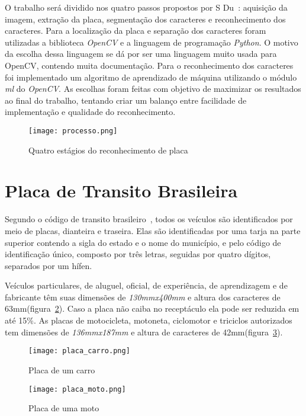 O trabalho será dividido nos quatro passos propostos por S
Du~\cite{s2013automatic}: aquisição da imagem, extração da placa, segmentação
dos caracteres e reconhecimento dos caracteres. Para a localização da placa e separação dos
caracteres foram utilizadas a biblioteca \emph{OpenCV} e a linguagem de programação
\emph{Python}. O motivo da escolha dessa linguagem se dá por ser uma linguagem
muito usada para OpenCV\@, contendo muita documentação. Para o reconhecimento dos caracteres foi implementado um algoritmo de aprendizado de máquina utilizando o módulo \emph{ml} do \emph{OpenCV}. As escolhas foram feitas
com objetivo de maximizar os resultados ao final do trabalho, tentando criar
um balanço entre facilidade de implementação e qualidade do reconhecimento.

\begin{figure}[H]
	\centering
	\texttt{[image: processo.png]}
	\caption{Quatro estágios do reconhecimento de placa}
	\label{fig:processo}
\end{figure}

\section{Placa de Transito Brasileira}
\label{sec:placabr}

Segundo o código de transito brasileiro~\cite{brasil1997lei}, todos os veículos
são identificados por meio de placas, dianteira e traseira. Elas são
identificadas por uma tarja na parte superior contendo a sigla do estado e o
nome do município, e pelo código de identificação único, composto por três
letras, seguidas por quatro dígitos, separados por um hífen.

Veículos particulares, de aluguel, oficial, de experiência, de aprendizagem e de
fabricante têm suas dimensões de \emph{130mmx400mm} e altura dos caracteres de 63mm(figura~\ref{fig:placa_carro}).
Caso a placa não caiba no receptáculo ela pode ser reduzida em até 15\%. As
placas de motocicleta, motoneta, ciclomotor e triciclos autorizados tem
dimensões de \emph{136mmx187mm} e altura de caracteres de 42mm(figura~\ref{fig:placa_moto}).

\begin{figure}[H]
	\centering
	\texttt{[image: placa\_carro.png]}
	\caption{Placa de um carro}
	\label{fig:placa_carro}
\end{figure}

\begin{figure}[H]
	\centering
	\texttt{[image: placa\_moto.png]}
	\caption{Placa de uma moto}
	\label{fig:placa_moto}
\end{figure}

